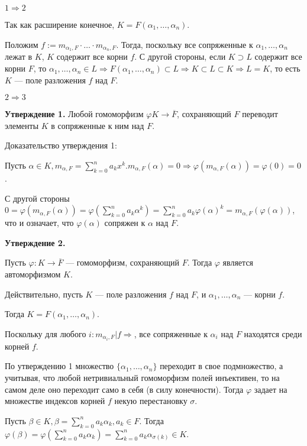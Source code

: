 \begin{solution}
\(1 \Rightarrow 2\)

Так как расширение конечное, \(K = F(\alpha_1, \ldots, \alpha_n)\).

Положим \(f := m_{\alpha_1, F} \cdot \ldots \cdot m_{\alpha_n, F}\). Тогда, поскольку все сопряженные к \(\alpha_1, \ldots, \alpha_n\) лежат в \(K\), \(K\) содержит все корни \(f\). С другой стороны, если \(K \supset L\) содержит все корни \(F\), то \(\alpha_1, \ldots, \alpha_n \in L \Rightarrow F(\alpha_1, \ldots, \alpha_n) \subset L \Rightarrow K \subset L \subset K \Rightarrow L = K\), то есть \(K\) --- поле разложения \(f\) над \(F\).

\(2 \Rightarrow 3\)

\textbf{Утверждение 1.} Любой гомоморфизм \(\varphi K \to \overline{F}\), сохраняющий \(F\) переводит элементы \(K\) в сопряженные к ним над \(F\).

Доказательство утверждения 1:

Пусть \(\alpha \in K, m_{\alpha, F} = \sum\limits_{k=0}^n a_kx^k. m_{\alpha, F}(\alpha) = 0 \Rightarrow \varphi(m_{\alpha, F}(\alpha)) = \varphi(0) = 0\).

С другой стороны \(0 = \varphi(m_{\alpha, F}(\alpha)) = \varphi(\sum\limits_{k=0}^n a_k \alpha^k) = \sum\limits_{k=0}^n a_k \varphi(\alpha)^k = m_{\alpha, F}(\varphi(\alpha))\),
что и означает, что \(\varphi(\alpha)\) сопряжен к \(\alpha\) над \(F\).

\hypertarget{9.1.statement.2}{\textbf{Утверждение 2.}}
Пусть \(\varphi: K \to \overline{F}\) --- гомоморфизм, сохраняющий \(F\). Тогда \(\varphi\) является автоморфизмом \(K\).

Действительно, пусть \(K\) --- поле разложения \(f\) над \(F\), и
\(\alpha_1, \ldots, \alpha_n\) --- корни \(f\).

Тогда \(K = F(\alpha_1, \ldots, \alpha_n)\).

Поскольку для любого \(i: m_{\alpha_i, F} | f \Rightarrow\), все сопряженные к \(\alpha_i\) над \(F\) находятся среди корней \(f\).

По утверждению 1 множество \(\{\alpha_1, \ldots, \alpha_n\}\) переходит в свое подмножество, а учитывая, что любой нетривиальный гомоморфизм полей инъективен, то на самом деле оно переходит само в себя (в силу конечности). Тогда \(\varphi\) задает на множестве индексов корней \(f\) некую перестановку \(\sigma\).

Пусть \(\beta \in K, \beta = \sum\limits_{k=0}^n a_k \alpha_k, a_k \in F\). Тогда \(\varphi(\beta) = \varphi(\sum\limits_{k=0}^n a_k \alpha_k) = \sum\limits_{k=0}^n a_k \alpha_{\sigma(k)} \in K\).


\end{solution}
